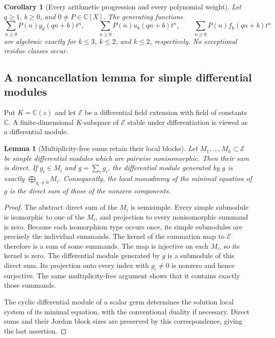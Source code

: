 \documentclass[11pt,a4paper]{article}
\newtheorem{lemma}[theorem]{Lemma}
\newtheorem{corollary}[theorem]{Corollary}
\theoremstyle{definition}
\theoremstyle{remark}
\numberwithin{equation}{section}
\begin{document}
\begin{corollary}[Every arithmetic progression and every polynomial weight]
\label{E:qpa:subsequence}
Let $q\ge1$, $b\ge0$, and $0\ne P\in\mathbb C[X]$.
The generating functions
\[
 \sum_{n\ge0}P(n)y_k(qn+b)t^n,\qquad
 \sum_{n\ge0}P(n)u_k(qn+b)t^n,\qquad
 \sum_{n\ge0}P(n)f_k(qn+b)t^n
\]
are algebraic exactly for $k\le3$, $k\le2$, and $k\le2$,
respectively.  No exceptional residue classes occur.
\end{corollary}

\subsection{A noncancellation lemma for simple differential modules}

Put $K=\mathbb C(z)$ and let $\mathcal E$ be a differential field
extension with field of constants $\mathbb C$.  A finite-dimensional
$K$-subspace of $\mathcal E$ stable under differentiation is viewed as a
differential module.

\begin{lemma}[Multiplicity-free sums retain their local blocks]
\label{E:qpa:noncancellation}
Let $M_1,\ldots,M_h\subset\mathcal E$ be simple differential modules
which are pairwise nonisomorphic.  Then their sum is direct.  If
$g_i\in M_i$ and $g=\sum_i g_i$, the differential module generated by
$g$ is exactly $\bigoplus_{g_i\ne0}M_i$.
Consequently, the local monodromy of the minimal equation of $g$
is the direct sum of those of the nonzero components.
\end{lemma}
\begin{proof}
The abstract direct sum of the $M_i$ is semisimple.  Every simple
submodule is isomorphic to one of the $M_i$, and projection to every
nonisomorphic summand is zero.  Because each isomorphism type occurs
once, its simple submodules are precisely the individual summands.
The kernel of the summation map to $\mathcal E$ therefore is a sum
of some summands.  The map is injective on each $M_i$, so its kernel
is zero.  The differential module generated by $g$ is a submodule of
this direct sum.  Its projection onto every index with $g_i\ne0$ is
nonzero and hence surjective.  The same multiplicity-free argument
shows that it contains exactly those summands.

The cyclic differential module of a scalar germ determines the
solution local system of its minimal equation, with the conventional
duality if necessary.  Direct sums and their Jordan block sizes are
preserved by this correspondence, giving the last assertion.
\end{proof}
\end{document}
